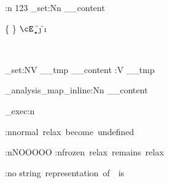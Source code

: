 \documentclass[12pt]{article}
\begin{document}
\ExplSyntaxOn
\pretty:n {123}
\tl_set:Nn \__content {
	\cFrozenRelax
	\relax

	\cB \a \cE \z
	\cB \{ \cE \}
	\cB \( \cE \)
	\cM \b
	\cT \c
	\cP \d
	\cU \e
	\cD \f
	\cS \j
	\cL \g
	\cO \h
	\cA \i \cA {\~\ }
	
	\cM \  %
	\cT \  %
	\cP \  %
	\cU \  %
	\cD \  %
	\cS \  %
	\cL \  %
	\cO \  %
}

\benchmark{--}
\precattl_set:NV \__tmp \__content
\pretty:V \__tmp


\benchmark{--}
\tl_analysis_map_inline:Nn \__content {}

\precattl_exec:n {
	\begingroup
	\let\relax\undefined

	\ifx \relax \undefined
		\pretty:n{normal~relax~become~undefined}
	\fi

	\ifx \cFrozenRelax \undefined
		\pretty:n{NOOOOO}
	\else
		\pretty:n{frozen~relax~remains~relax}
	\fi
	\endgroup

	\pretty:no {string~representation~of~\cFrozenRelax~is~}
		{\string\cFrozenRelax}
}

\ExplSyntaxOff
\end{document}
